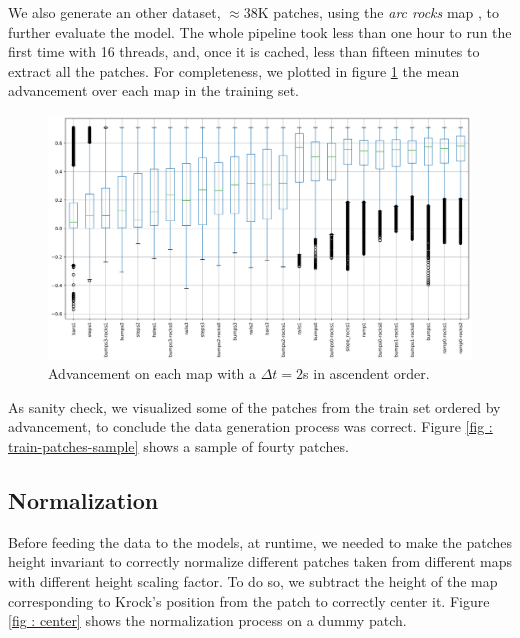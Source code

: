 \documentclass[../document.tex]{subfiles}
\begin{document}
We also generate an other dataset, $\approx 38$K patches, using the \emph{arc rocks} map , to further evaluate the model. The whole pipeline took less than one hour to run the first time with 16 threads, and, once it is cached, less than fifteen minutes to extract all the patches. For completeness, we plotted in figure \ref{fig : mean-advs-train} the mean advancement over each map in the training set. 
\begin{figure}[htbp]
    \centering
    \includegraphics[width=\linewidth]{../img/datasets/box_for_each_map.png}
    \caption{Advancement on each map with a $\Delta t = 2$s in ascendent order.}
    \label{fig : mean-advs-train}
\end{figure}
As sanity check, we visualized some of the patches from the train set ordered by advancement, to conclude the data generation process was correct. Figure \ref{fig : train-patches-sample} shows a sample of fourty patches.


\subsection{Normalization}
Before feeding the data to the models, at runtime, we needed to make the patches height invariant to correctly normalize different patches taken from different maps with different height scaling factor. To do so, we subtract the height of the map corresponding to Krock's position from the patch to correctly center it. Figure \ref{fig : center} shows the normalization process on a dummy patch.
\end{document}
